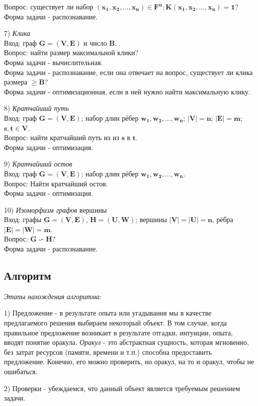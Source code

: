     Вопрос: существует ли набор $\boldsymbol{(x_1, x_2, ... , x_n)\in F^n: K(x_1, x_2, ... , x_n) = 1}$?\\
    Форма задачи - распознавание.
    \par 7) \textit{Клика} \\
    Вход: граф $\boldsymbol{G = (V, E)}$ и число $\boldsymbol{B}$. \\
    Вопрос: найти размер максимальной клики? \\
    Форма задачи - вычислительная. \\
    Форма задачи - распознавание, если она отвечает на вопрос, существует ли клика размера $\boldsymbol{\ge B}$? \\
    Форма задачи - оптимизационная, если в ней нужно найти максимальную клику.
    \par 8) \textit{Кратчайший путь} \\
    Вход: граф $\boldsymbol{G = (V, E)}$; набор длин рёбер $\boldsymbol{w_1, w_2, ... , w_n}$;
    $\boldsymbol{|V| = n}$; $\boldsymbol{|E| = m}$; $\boldsymbol{s,t \in V}$. \\
    Вопрос: найти кратчайший путь из из $\boldsymbol{s}$ в $\boldsymbol{t}$. \\
    Форма задачи - оптимизация.
    \par 9) \textit{Кратчайший остов} \\
    Вход: граф $\boldsymbol{G = (V, E)}$; набор длин рёбер $\boldsymbol{w_1, w_2, ... , w_n}$. \\
    Вопрос: Найти кратчайший остов. \\
    Форма задачи - оптимизация.
    \par 10) \textit{Изоморфизм графов} вершины \\
    Вход: графы $\boldsymbol{G = (V, E)}$, $\boldsymbol{H = (U, W)}$; вершины $\boldsymbol{|V| = |U| = n}$, рёбра $\boldsymbol{|E| = |W| = m}$. \\
    Вопрос: $\boldsymbol{G\backsim H}$?\\
    Форма задачи - распознавание.
  
\subsection{Алгоритм}

    \par \textit{Этапы нахождения алгоритма}:
    \par 1) Предложение - в результате опыта или угадывания мы в качестве предлагаемого решения выбираем некоторый объект. В том случае, когда правильное предложение возникает в результате отгадки, интуиции, опыта, вводят понятие оракула. \textit{Оракул} - это абстрактная сущность, которая мгновенно, без затрат ресурсов (памяти, времени и т.п.) способна предоставить предложение. Конечно, его можно проверить, но оракул, на то и оракул, чтобы не ошибаться.
    \par 2) Проверки - убеждаемся, что данный объект является требуемым решением задачи.

